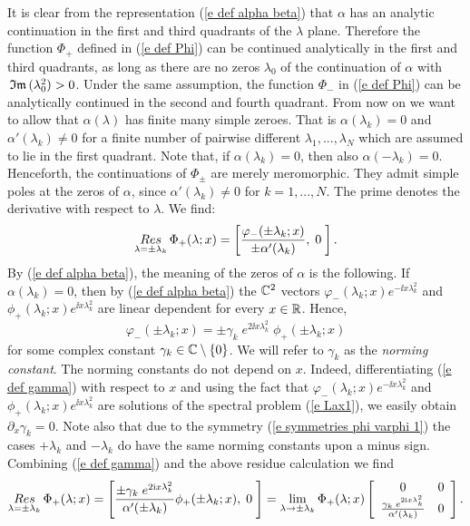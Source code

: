It is clear from the representation (\ref{e def alpha beta}) that $\alpha$ has an analytic continuation in the first and third quadrants of the $\lambda$ plane. Therefore the function $\Phi_+$ defined in (\ref{e def Phi}) can be continued analytically in the first and third quadrants, as long as there are no zeros $\lambda_0$ of the continuation of $\alpha$ with $\,\mathfrak{Im}\,(\lambda_0^2)>0$. Under the same assumption, the function $\Phi_-$ in (\ref{e def Phi}) can be analytically continued in the second and fourth quadrant. From now on we want to allow that $\alpha(\lambda)$ has finite many simple zeroes. That is $\alpha(\lambda_k)=0$ and $\alpha'(\lambda_k)\neq0$ for a finite number of pairwise different $\lambda_1,...,\lambda_N$ which are assumed to lie in the first quadrant. Note that, if $\alpha(\lambda_k)=0$, then also $\alpha(-\lambda_k)=0$. Henceforth, the continuations of $\Phi_{\pm}$ are merely meromorphic. They admit simple poles at the zeros of $\alpha$, since  $\alpha'(\lambda_k)\neq0$ for $k=1,...,N$. The prime denotes the derivative with respect to $\lambda$. We find:
\begin{equation*}
    \mathop{Res}_{\lambda=\pm\lambda_k}
    \Phi_+(\lambda;x)=
    \left[\frac{\varphi_{-}(\pm\lambda_k;x)} {\pm\alpha'(\lambda_k)},\;0\;
    \right].
\end{equation*}
By (\ref{e def alpha beta}), the meaning of the zeros of $\alpha$ is the following. If $\alpha(\lambda_k)=0$, then by (\ref{e def alpha beta}) the $\mathbb C^2$ vectors $\varphi_{-}(\lambda_k;x)e^{-\ii x\lambda_k^2}$ and $\phi_{+}(\lambda_k;x)e^{\ii x\lambda_k^2}$ are linear dependent for every $x\in\mathbb R$. Hence,
\begin{equation}\label{e def gamma}
    \varphi_{-}(\pm\lambda_k;x)=\pm\gamma_k\; e^{2\ii x\lambda_k^2}\; \phi_{+}(\pm\lambda_k;x)
\end{equation}
for some complex constant $\gamma_k\in\mathbb C\setminus\left\{0\right\}$. We will refer to $\gamma_k$ as the \emph{norming constant}. The norming constants do not depend on $x$. Indeed, differentiating (\ref{e def gamma}) with respect to $x$ and using the fact that  $\varphi_{-}(\lambda_k;x)e^{-\ii x\lambda_k^2}$ and $\phi_{+}(\lambda_k;x)e^{\ii x\lambda_k^2}$ are solutions of the spectral problem (\ref{e Lax1}), we easily obtain $\partial_x \gamma_k=0$. Note also that due to the symmetry (\ref{e symmetries phi varphi 1}) the cases $+\lambda_k$ and $-\lambda_k$ do have the same norming constants upon a minus sign.  Combining (\ref{e def gamma}) and the above residue calculation we find
\begin{equation}\label{e res Phi}
    \mathop{Res}_{\lambda=\pm\lambda_k}
    \Phi_+(\lambda;x)=
    \left[\frac{\pm\gamma_k \; e^{2\mathrm{i} x\lambda_k^2}} {\alpha'(\pm\lambda_k)}\phi_{+}(\pm\lambda_k;x),\;0\;
    \right]=
    \lim_{\lambda\to\pm\lambda_k}\Phi_+(\lambda;x)
    \left[
      \begin{array}{cc}
        0 & 0\\
        \frac{\gamma_k \; e^{2\mathrm{i} x\lambda_k^2}} {\alpha'(\lambda_k)} & 0 \\
      \end{array}
    \right].
\end{equation}
